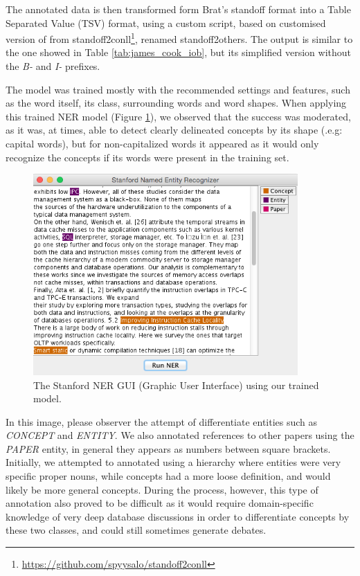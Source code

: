 \documentclass[11pt,a4paper,openright]{memoir}
\begin{document}
The annotated data is then transformed form Brat's standoff format \cite{Stenetorp:2012:BWT:2380921.2380942} into a Table Separated Value (TSV) format, using a custom script, based on customised version of from standoff2conll\footnote{\url{https://github.com/spyysalo/standoff2conll}}, renamed standoff2others. The output is similar to the one showed in Table \ref{tab:james_cook_iob}, but its simplified version without the \emph{B-} and \emph{I-} prefixes.

The model was trained mostly with the recommended settings and features, such as the word itself, its class, surrounding words and word shapes. When applying this trained NER model (Figure \ref{fig:stanford_ner_usage}), we observed that the success was moderated, as it was, at times, able to detect clearly delineated concepts by its shape (.e.g: capital words), but for non-capitalized words it appeared as it would only recognize the concepts if its words were present in the training set.

\begin{figure}[!htbp]
  \centering
    \includegraphics[width=0.9\textwidth]{./images/stanford_ner}
  \caption[The Stanford NER GUI (Graphic User Interface) using our trained model.]{The Stanford NER GUI (Graphic User Interface) using our trained model.}
  \label{fig:stanford_ner_usage}
\end{figure}

In this image, please observer the attempt of differentiate entities such as \emph{CONCEPT} and \emph{ENTITY}. We also annotated references to other papers using the \emph{PAPER} entity, in general they appears as numbers between square brackets. Initially, we attempted to annotated using a hierarchy where entities were very specific proper nouns, while concepts had a more loose definition, and would likely be more general concepts. During the process, however, this type of annotation also proved to be difficult as it would require domain-specific knowledge of very deep database discussions in order to differentiate concepts by these two classes, and could still sometimes generate debates.
\end{document}
